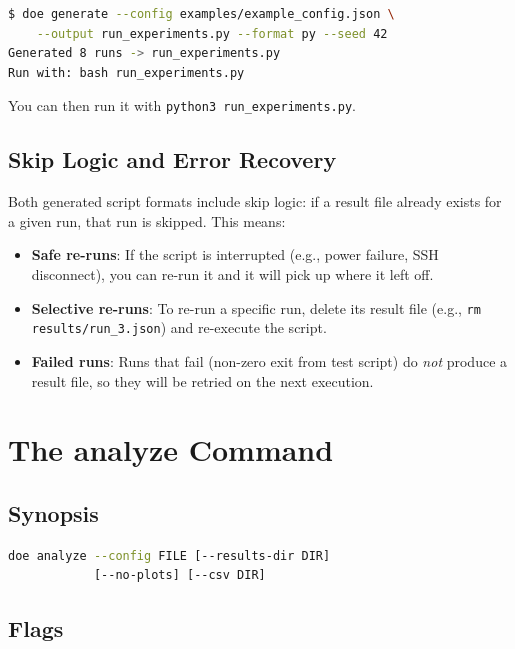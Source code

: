\documentclass[11pt]{book}
\begin{document}
\begin{example}
\begin{lstlisting}[language=bash]
$ doe generate --config examples/example_config.json \
    --output run_experiments.py --format py --seed 42
Generated 8 runs -> run_experiments.py
Run with: bash run_experiments.py
\end{lstlisting}
You can then run it with \texttt{python3 run\_experiments.py}.
\end{example}

\section{Skip Logic and Error Recovery}

Both generated script formats include skip logic: if a result file already exists for a given run, that run is skipped. This means:

\begin{itemize}
  \item \textbf{Safe re-runs}: If the script is interrupted (e.g., power failure, SSH disconnect), you can re-run it and it will pick up where it left off.
  \item \textbf{Selective re-runs}: To re-run a specific run, delete its result file (e.g., \texttt{rm results/run\_3.json}) and re-execute the script.
  \item \textbf{Failed runs}: Runs that fail (non-zero exit from test script) do \emph{not} produce a result file, so they will be retried on the next execution.
\end{itemize}


\chapter{The analyze Command}
\label{ch:analyze}

\section{Synopsis}

\begin{lstlisting}[language=bash]
doe analyze --config FILE [--results-dir DIR]
            [--no-plots] [--csv DIR]
\end{lstlisting}

\section{Flags}
\end{document}
